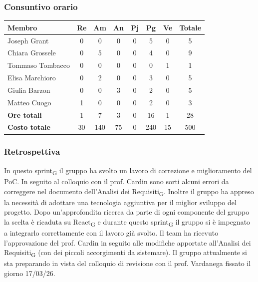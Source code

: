 \documentclass[11pt,a4paper]{article}
\newcommand{\gls}[1]{#1\textsubscript{G}}
\begin{document}
\subsubsection{Consuntivo orario}
\begin{center}
    \begin{tabular}{|l|c|c|c|c|c|c|c|}
        \hline
        \textbf{Membro} & \textbf{Re} & \textbf{Am} & \textbf{An} & \textbf{Pj} & \textbf{Pg} & \textbf{Ve} & \textbf{Totale} \\
        \hline
        Joseph Grant & 0 & 0 & 0 & 0 & 5 & 0 & 5 \\
        \hline
        Chiara Grossele & 0 & 5 & 0 & 0 & 4 & 0 & 9 \\
        \hline
        Tommaso Tombacco & 0 & 0 & 0 & 0 & 0 & 1 & 1 \\
        \hline
        Elisa Marchioro & 0 & 2 & 0 & 0 & 3 & 0 & 5 \\
        \hline
        Giulia Barzon & 0 & 0 & 3 & 0 & 2 & 0 & 5 \\
        \hline
        Matteo Cuogo & 1 & 0 & 0 & 0 & 2 & 0 & 3 \\
        \hline
        \textbf{Ore totali} & 1 & 7 & 3 & 0 & 16 & 1 & 28 \\
        \hline
        \textbf{Costo totale} & 30 & 140 & 75 & 0 & 240 & 15 & 500 \\
        \hline
    \end{tabular}
\end{center}

\subsubsection{Retrospettiva}
In questo \gls{sprint} il gruppo ha svolto un lavoro di correzione e miglioramento del PoC. In seguito al colloquio con il prof. Cardin sono sorti alcuni errori da correggere nel documento dell'\gls{Analisi dei Requisiti}. Inoltre il gruppo ha appreso la necessità di adottare una tecnologia aggiuntiva per il miglior sviluppo del progetto. Dopo un'approfondita ricerca da parte di ogni componente del gruppo la scelta è ricaduta su \gls{React} e durante questo \gls{sprint} il gruppo si è impegnato a integrarlo correttamente con il lavoro già svolto. Il team ha ricevuto l'approvazione del prof. Cardin in seguito alle modifiche apportate all'\gls{Analisi dei Requisiti} (con dei piccoli accorgimenti da sistemare). Il gruppo attualmente si sta preparando in vista del colloquio di revisione con il prof. Vardanega fissato il giorno 17/03/26.
\end{document}
